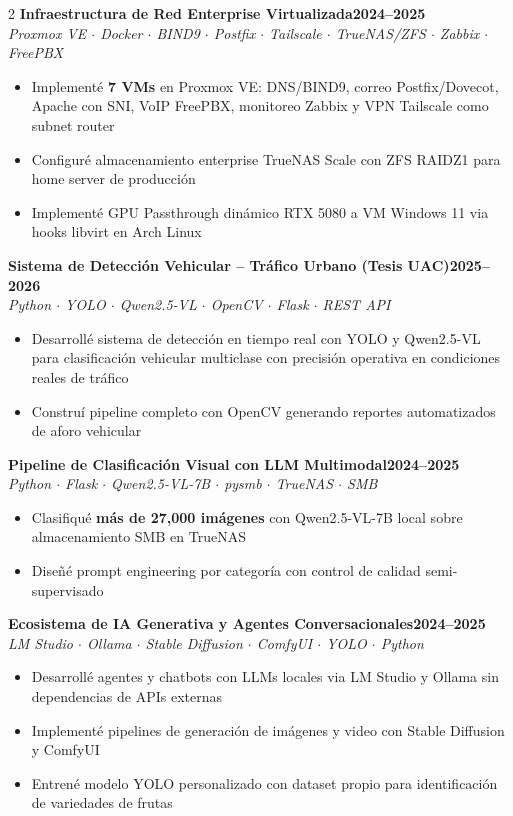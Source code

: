 \documentclass[letterpaper,10pt]{article}
\newcommand{\cvproject}[3]{%
  \vspace{3pt}
  {\small\textbf{#1}}\hfill{\small\textbf{#2}}\\
  {\footnotesize\color{accentblue}\textit{#3}}
  \vspace{1pt}
}
\newcommand{\cvbullet}{\begin{itemize}[leftmargin=0.15in,itemsep=-1pt,topsep=1pt]}
\newcommand{\cvbulletend}{\end{itemize}\vspace{2pt}}
\begin{document}
\begin{paracol}{2}
\cvproject{Infraestructura de Red Enterprise Virtualizada}{2024--2025}
{Proxmox VE $\cdot$ Docker $\cdot$ BIND9 $\cdot$ Postfix $\cdot$ Tailscale $\cdot$ TrueNAS/ZFS $\cdot$ Zabbix $\cdot$ FreePBX}
\cvbullet
  \item[\small\textbullet] Implement\'e \textbf{7 VMs} en Proxmox VE: DNS/BIND9, correo Postfix/Dovecot, Apache con SNI, VoIP FreePBX, monitoreo Zabbix y VPN Tailscale como subnet router
  \item[\small\textbullet] Configur\'e almacenamiento enterprise TrueNAS Scale con ZFS RAIDZ1 para home server de producci\'on
  \item[\small\textbullet] Implement\'e GPU Passthrough din\'amico RTX 5080 a VM Windows 11 via hooks libvirt en Arch Linux
\cvbulletend

\cvproject{Sistema de Detecci\'on Vehicular -- Tr\'afico Urbano (Tesis UAC)}{2025--2026}
{Python $\cdot$ YOLO $\cdot$ Qwen2.5-VL $\cdot$ OpenCV $\cdot$ Flask $\cdot$ REST API}
\cvbullet
  \item[\small\textbullet] Desarroll\'e sistema de detecci\'on en tiempo real con YOLO y Qwen2.5-VL para clasificaci\'on vehicular multiclase con precisi\'on operativa en condiciones reales de tr\'afico
  \item[\small\textbullet] Constru\'i pipeline completo con OpenCV generando reportes automatizados de aforo vehicular
\cvbulletend

\cvproject{Pipeline de Clasificaci\'on Visual con LLM Multimodal}{2024--2025}
{Python $\cdot$ Flask $\cdot$ Qwen2.5-VL-7B $\cdot$ pysmb $\cdot$ TrueNAS $\cdot$ SMB}
\cvbullet
  \item[\small\textbullet] Clasifiqu\'e \textbf{m\'as de 27,000 im\'agenes} con Qwen2.5-VL-7B local sobre almacenamiento SMB en TrueNAS
  \item[\small\textbullet] Dise\~n\'e prompt engineering por categor\'ia con control de calidad semi-supervisado
\cvbulletend

\cvproject{Ecosistema de IA Generativa y Agentes Conversacionales}{2024--2025}
{LM Studio $\cdot$ Ollama $\cdot$ Stable Diffusion $\cdot$ ComfyUI $\cdot$ YOLO $\cdot$ Python}
\cvbullet
  \item[\small\textbullet] Desarroll\'e agentes y chatbots con LLMs locales via LM Studio y Ollama sin dependencias de APIs externas
  \item[\small\textbullet] Implement\'e pipelines de generaci\'on de im\'agenes y video con Stable Diffusion y ComfyUI
  \item[\small\textbullet] Entren\'e modelo YOLO personalizado con dataset propio para identificaci\'on de variedades de frutas
\cvbulletend


\end{paracol}
\end{document}
